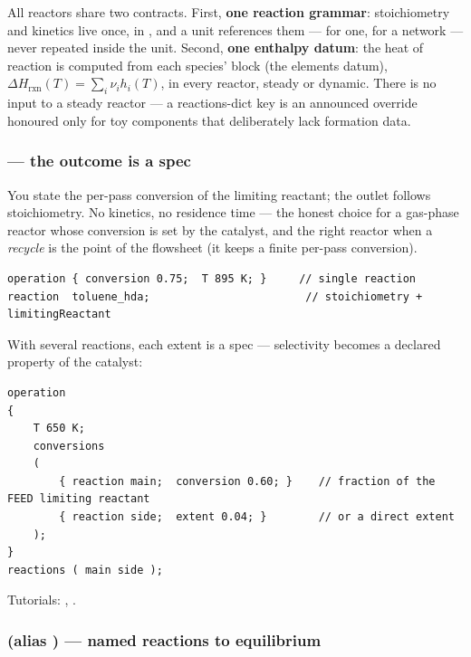 \documentclass[11pt,a4paper]{article}
\begin{document}
All reactors share two contracts.  First, \textbf{one reaction
grammar}: stoichiometry and kinetics live once, in
, and a unit references them ---
 for one,  for a
network --- never repeated inside the unit.  Second, \textbf{one
enthalpy datum}: the heat of reaction is computed from each species'
 block (the elements datum),
$\Delta H_{\mathrm{rxn}}(T) = \sum_i \nu_i h_i(T)$, in every reactor,
steady or dynamic.  There is no  input to a steady
reactor --- a reactions-dict  key is an announced override
honoured only for toy components that deliberately lack formation data.

\subsubsection{ --- the outcome is a spec}

You state the per-pass conversion of the limiting reactant; the outlet
follows stoichiometry.  No kinetics, no residence time --- the honest
choice for a gas-phase reactor whose conversion is set by the catalyst,
and the right reactor when a \emph{recycle} is the point of the
flowsheet (it keeps a finite per-pass conversion).

\begin{lstlisting}[language=dict]
operation { conversion 0.75;  T 895 K; }     // single reaction
reaction  toluene_hda;                        // stoichiometry + limitingReactant
\end{lstlisting}

With several reactions, each extent is a spec --- selectivity becomes a
declared property of the catalyst:

\begin{lstlisting}[language=dict]
operation
{
    T 650 K;
    conversions
    (
        { reaction main;  conversion 0.60; }    // fraction of the FEED limiting reactant
        { reaction side;  extent 0.04; }        // or a direct extent
    );
}
reactions ( main side );
\end{lstlisting}

Tutorials: ,
.

\subsubsection{ (alias ) --- named reactions to equilibrium}
\end{document}
